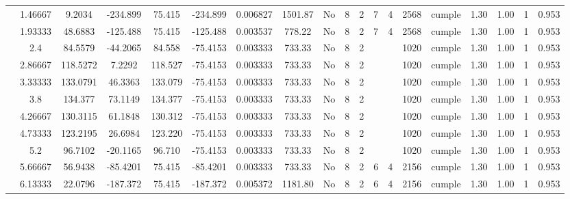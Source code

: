 \begin{table}[H]
{\begin{tabular}{|c|c|c|c|c|c|r|c|c|c|c|c|c|c|c|c|c|c|c|}
\cline{2-19}        & 1.46667 & 9.2034 & -234.899 & 75.415 & -234.899 & 0.006827 & 1501.87 & No  & 8   & 2   & 7   & 4   & 2568 & \cellcolor[rgb]{ .776,  .937,  .808}cumple & 1.30 & 1.00 & 1   & 0.953 \bigstrut\\
\cline{2-19}        & 1.93333 & 48.6883 & -125.488 & 75.415 & -125.488 & 0.003537 & 778.22 & No  & 8   & 2   & 7   & 4   & 2568 & \cellcolor[rgb]{ .776,  .937,  .808}cumple & 1.30 & 1.00 & 1   & 0.953 \bigstrut\\
\cline{2-19}        & 2.4 & 84.5579 & -44.2065 & 84.558 & -75.4153 & 0.003333 & 733.33 & No  & 8   & 2   &     &     & 1020 & \cellcolor[rgb]{ .776,  .937,  .808}cumple & 1.30 & 1.00 & 1   & 0.953 \bigstrut\\
\cline{2-19}        & 2.86667 & 118.5272 & 7.2292 & 118.527 & -75.4153 & 0.003333 & 733.33 & No  & 8   & 2   &     &     & 1020 & \cellcolor[rgb]{ .776,  .937,  .808}cumple & 1.30 & 1.00 & 1   & 0.953 \bigstrut\\
\cline{2-19}        & 3.33333 & 133.0791 & 46.3363 & 133.079 & -75.4153 & 0.003333 & 733.33 & No  & 8   & 2   &     &     & 1020 & \cellcolor[rgb]{ .776,  .937,  .808}cumple & 1.30 & 1.00 & 1   & 0.953 \bigstrut\\
\cline{2-19}        & 3.8 & 134.377 & 73.1149 & 134.377 & -75.4153 & 0.003333 & 733.33 & No  & 8   & 2   &     &     & 1020 & \cellcolor[rgb]{ .776,  .937,  .808}cumple & 1.30 & 1.00 & 1   & 0.953 \bigstrut\\
\cline{2-19}        & 4.26667 & 130.3115 & 61.1848 & 130.312 & -75.4153 & 0.003333 & 733.33 & No  & 8   & 2   &     &     & 1020 & \cellcolor[rgb]{ .776,  .937,  .808}cumple & 1.30 & 1.00 & 1   & 0.953 \bigstrut\\
\cline{2-19}        & 4.73333 & 123.2195 & 26.6984 & 123.220 & -75.4153 & 0.003333 & 733.33 & No  & 8   & 2   &     &     & 1020 & \cellcolor[rgb]{ .776,  .937,  .808}cumple & 1.30 & 1.00 & 1   & 0.953 \bigstrut\\
\cline{2-19}        & 5.2 & 96.7102 & -20.1165 & 96.710 & -75.4153 & 0.003333 & 733.33 & No  & 8   & 2   &     &     & 1020 & \cellcolor[rgb]{ .776,  .937,  .808}cumple & 1.30 & 1.00 & 1   & 0.953 \bigstrut\\
\cline{2-19}        & 5.66667 & 56.9438 & -85.4201 & 75.415 & -85.4201 & 0.003333 & 733.33 & No  & 8   & 2   & 6   & 4   & 2156 & \cellcolor[rgb]{ .776,  .937,  .808}cumple & 1.30 & 1.00 & 1   & 0.953 \bigstrut\\
\cline{2-19}        & 6.13333 & 22.0796 & -187.372 & 75.415 & -187.372 & 0.005372 & 1181.80 & No  & 8   & 2   & 6   & 4   & 2156 & \cellcolor[rgb]{ .776,  .937,  .808}cumple & 1.30 & 1.00 & 1   & 0.953 \bigstrut\\

\end{tabular}}
\end{table}
